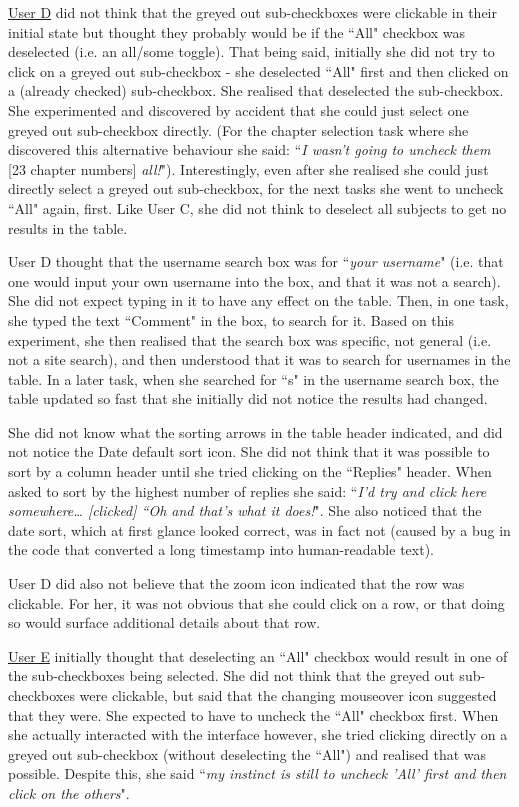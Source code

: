 \underline{User D} did not think that the greyed out sub-checkboxes were clickable in their initial state but thought they probably would be if the ``All" checkbox was deselected (i.e. an all/some toggle). That being said, initially she did not try to click on a greyed out sub-checkbox - she deselected ``All" first and then clicked on a (already checked) sub-checkbox. She realised that deselected the sub-checkbox. She experimented and discovered by accident that she could just select one greyed out sub-checkbox directly. (For the chapter selection task where she discovered this alternative behaviour she said: ``\textit{I wasn't going to uncheck them} [23 chapter numbers] \textit{all!}"). Interestingly, even after she realised she could just directly select a greyed out sub-checkbox, for the next tasks she went to uncheck ``All" again, first. Like User C, she did not think to deselect all subjects to get no results in the table. 

User D thought that the username search box was for ``\textit{your username}" (i.e. that one would input your own username into the box, and that it was not a search). She did not expect typing in it to have any effect on the table. Then, in one task, she typed the text ``Comment" in the box, to search for it. Based on this experiment, she then realised that the search box was specific, not general (i.e. not a site search), and then understood that it was to search for usernames in the table. In a later task, when she searched for ``s" in the username search box, the table updated so fast that she initially did not notice the results had changed.

She did not know what the sorting arrows in the table header indicated, and did not notice the Date default sort icon. She did not think that it was possible to sort by a column header until she tried clicking on the ``Replies" header. When asked to sort by the highest number of replies she said: ``\textit{I'd try and click here somewhere… [clicked] ``Oh and that's what it does!}". She also noticed that the date sort, which at first glance looked correct, was in fact not (caused by a bug in the code that converted a long timestamp into human-readable text). 

User D did also not believe that the zoom icon indicated that the row was clickable. For her, it was not obvious that she could click on a row, or that doing so would surface additional details about that row. 

\underline{User E} initially thought that deselecting an ``All" checkbox would result in one of the sub-checkboxes being selected. She did not think that the greyed out sub-checkboxes were clickable, but said that the changing mouseover icon suggested that they were. She expected to have to uncheck the ``All" checkbox first. When she actually interacted with the interface however, she tried clicking directly on a greyed out sub-checkbox (without deselecting the ``All") and realised that was possible. Despite this, she said ``\textit{my instinct is still to uncheck 'All' first and then click on the others}".

